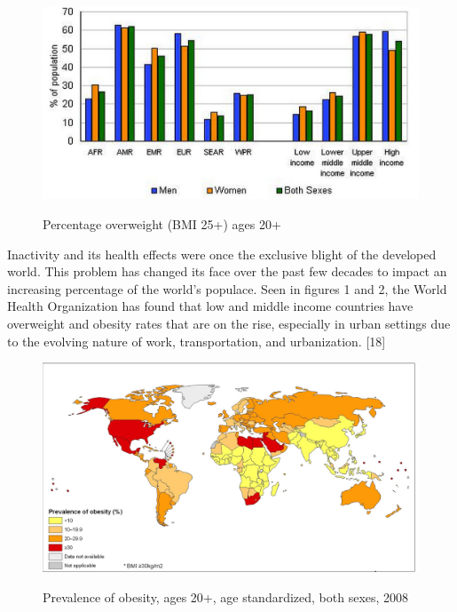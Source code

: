 \documentclass[12pt,journal]{IEEEtran}
\begin{document}
		\begin{figure}[htpb]
	    	\caption{Percentage overweight (BMI 25+) ages 20+}
	    	\centering
			\vspace{10}
	    	\includegraphics[width=\textwidth]{overweightbyincome}
			\cite{23}
		\end{figure}
		\FloatBarrier
		
		Inactivity and its health effects were once the exclusive blight of the developed world. This problem has changed its face 
		over the past few decades to impact an increasing percentage of the world’s populace. Seen in figures 1 and 2, the World 
		Health Organization has found that low and middle income countries have overweight and obesity rates that are on the rise, 
		especially in urban settings due to the evolving nature of work, transportation, and urbanization. [18] 		
		\begin{figure}[htp]
	    	\caption{Prevalence of obesity, ages 20+, age standardized, both sexes, 2008}
	    	\centering
			\vspace{10}
	    	\includegraphics[width=\textwidth]{prevalenceofobesity}
			\cite{22}
		\end{figure}
				
\end{document}
